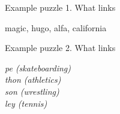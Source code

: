 \begin{frame}
    \large
    Example puzzle 1. What links
          \begin{center}
                  magic, hugo, alfa, california
          \end{center}
\end{frame}

\begin{frame}
   \large
   Example puzzle 2. What links
   \begin{center}
      \begin{minipage}{0.6\textwidth}
          \textit{%
              pe (skateboarding)  \\
              thon (athletics)  \\
              son (wrestling)  \\
              ley (tennis) }%
      \end{minipage}
   \end{center}


\end{frame}
